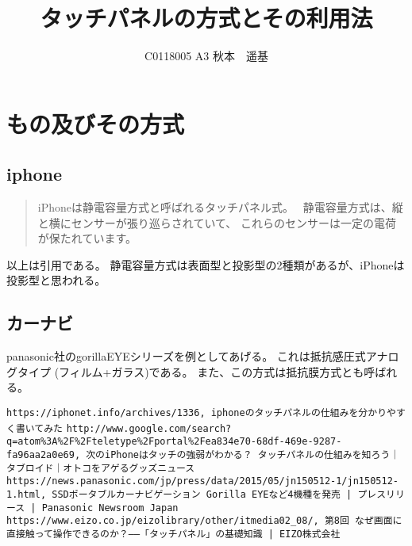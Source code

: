 \documentclass[uplatex]{jsarticle} %
\title{タッチパネルの方式とその利用法}
\author{C0118005 A3 秋本　遥基}
\date{}
\begin{document}
\maketitle

\section{もの及びその方式}
\subsection{iphone}

\begin{quotation}

iPhoneは静電容量方式と呼ばれるタッチパネル式。 
静電容量方式は、縦と横にセンサーが張り巡らされていて、
これらのセンサーは一定の電荷が保たれています。

\end{quotation}

以上は引用である。\cite{iphone}
静電容量方式は表面型と投影型の2種類があるが、iPhoneは投影型と思われる。\cite{source1}

\subsection{カーナビ}
panasonic社のgorillaEYEシリーズを例としてあげる。\cite{carnabi}
これは抵抗感圧式アナログタイプ (フィルム+ガラス)である。
また、この方式は抵抗膜方式とも呼ばれる。\cite{touchpanel}


\begin{thebibliography}{99}
   \verb+https://iphonet.info/archives/1336, iphoneのタッチパネルの仕組みを分かりやすく書いてみた+
   \verb+http://www.google.com/search?q=atom%3A%2F%2Fteletype%2Fportal%2Fea834e70-68df-469e-9287-fa96aa2a0e69, 次のiPhoneはタッチの強弱がわかる？ タッチパネルの仕組みを知ろう｜タブロイド｜オトコをアゲるグッズニュース+
   \verb+https://news.panasonic.com/jp/press/data/2015/05/jn150512-1/jn150512-1.html, SSDポータブルカーナビゲーション Gorilla EYEなど4機種を発売 | プレスリリース | Panasonic Newsroom Japan+
   \verb+https://www.eizo.co.jp/eizolibrary/other/itmedia02_08/, 第8回 なぜ画面に直接触って操作できるのか？――「タッチパネル」の基礎知識 | EIZO株式会社+
\end{thebibliography}
\end{document}

